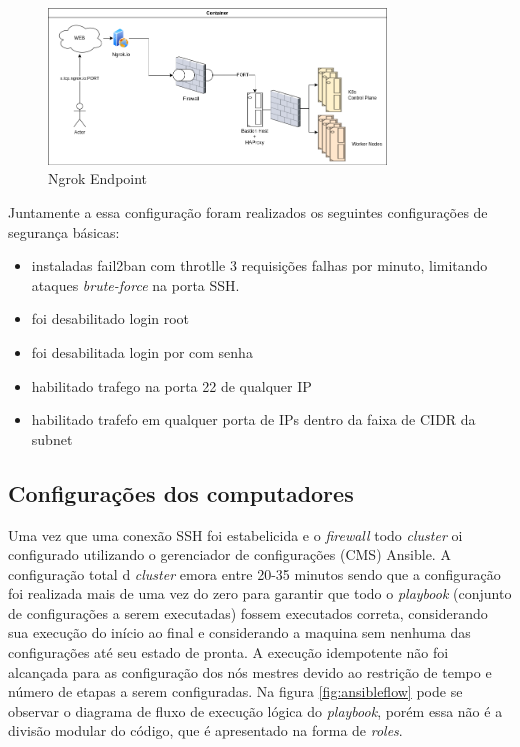 \begin{figure}[!ht]
    \centering
    \includegraphics[width=0.8\textwidth]{04-figuras/ngroktcp.png}
    \caption{Ngrok Endpoint}
    \label{fig:ngroktcp}
\end{figure}

Juntamente a essa configuração foram realizados os seguintes configurações de segurança básicas:

\begin{itemize}
    \item instaladas fail2ban com throtlle 3 requisições falhas por minuto, limitando ataques \emph{brute-force} na porta SSH.
    \item foi desabilitado login root
    \item foi desabilitada login por com senha
    \item habilitado trafego na porta 22 de qualquer IP
    \item habilitado trafefo em qualquer porta de IPs dentro da faixa de CIDR da subnet
\end{itemize}



\subsection{Configurações dos computadores }
Uma vez que uma conexão SSH foi estabelicida e o \emph{firewall} todo  \emph{cluster} oi configurado utilizando o gerenciador de configurações (CMS) Ansible\textregistered. A configuração total d \emph{cluster} emora entre 20-35 minutos sendo que a configuração foi realizada mais de uma vez do zero para garantir que todo o \emph{playbook} (conjunto de configurações a serem executadas) fossem executados correta, considerando sua execução do início ao final e considerando a maquina sem nenhuma das configurações até seu estado de pronta. A execução idempotente não foi alcançada para as configuração dos nós mestres devido ao restrição de tempo e número de etapas a serem configuradas. Na figura \ref{fig:ansibleflow} pode se observar o diagrama de fluxo de execução lógica do \emph{playbook}, porém essa não é a divisão modular do código, que é apresentado na forma de \emph{roles}. 


